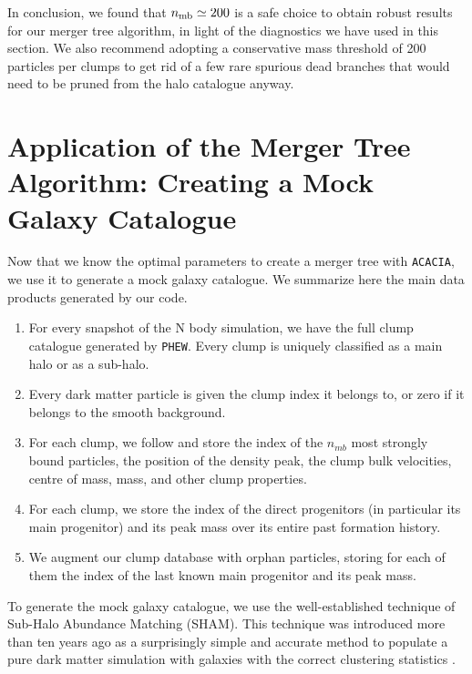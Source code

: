 \documentclass[a4paper,twocolumn,fleqn,usenatbib]{mnras}
\begin{document}
In conclusion, we found that $n_{\rm mb} \simeq 200$ is a safe choice
to obtain robust results for our merger tree algorithm, in light of
the diagnostics we have used in this section.  We also recommend
adopting a conservative mass threshold of 200 particles per clumps to
get rid of a few rare spurious dead branches that would need to be
pruned from the halo catalogue anyway.

\section{Application of the Merger Tree Algorithm: Creating a Mock Galaxy Catalogue}
\label{chap:mock_catalogues}

Now that we  know the optimal parameters to create  a merger tree with
\texttt{ACACIA}, we  use it to  generate a mock galaxy  catalogue.  We
summarize here the main data products generated by our code.
\begin{enumerate}
\item For  every snapshot of the  N body simulation, we  have the full
  clump catalogue  generated by \texttt{PHEW}. Every  clump is uniquely
  classified as a main halo or as a sub-halo.
\item Every dark  matter particle is given the clump  index it belongs
  to, or zero if it belongs to the smooth background.
\item For  each clump, we follow  and store the index  of the $n_{mb}$
  most strongly bound particles, the position of the density peak, the
  clump  bulk  velocities,  centre  of mass,  mass,  and  other  clump
  properties.
\item For each clump, we store the index of the direct progenitors (in
  particular its  main progenitor) and  its peak mass over  its entire
  past formation history.
\item We augment our clump database with orphan particles, storing for
  each of  them the index  of the last  known main progenitor  and its
  peak mass.
\end{enumerate}
To generate  the mock  galaxy catalogue,  we use  the well-established
technique of  Sub-Halo Abundance  Matching (SHAM). This  technique was
introduced  more than  ten  years  ago as  a  surprisingly simple  and
accurate  method  to  populate  a pure  dark  matter  simulation  with
galaxies  with the  correct  clustering statistics 
\citep{valeNonparametricModelLinking2006, shankarNewRelationshipsGalaxy2006, 
conroyModelingLuminositydependentGalaxy2006a}.
\end{document}
